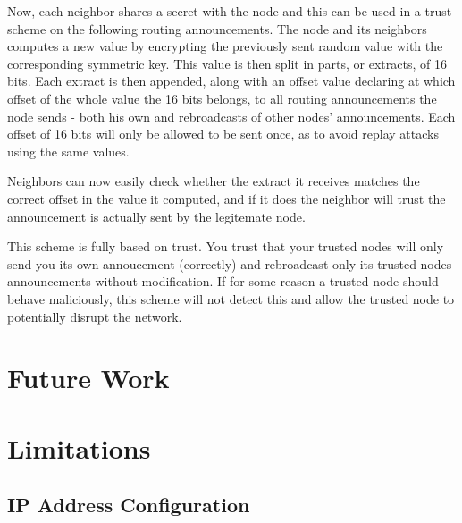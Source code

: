 Now, each neighbor shares a secret with the node and this can be used in a trust
scheme on the following routing announcements. The node and its neighbors
computes a new value by encrypting the previously sent random value with the
corresponding symmetric key. This value is then split in parts, or extracts, of
16 bits. Each extract is then appended, along with an offset value declaring at
which offset of the whole value the 16 bits belongs, to all routing
announcements the node sends - both his own and rebroadcasts of other nodes'
announcements. Each offset of 16 bits will only be allowed to be sent once, as
to avoid replay attacks using the same values. 

Neighbors can now easily check whether the extract it receives matches the
correct offset in the value it computed, and if it does the neighbor will trust
the announcement is actually sent by the legitemate node. 

This scheme is fully based on trust. You trust that your trusted nodes will only
send you its own annoucement (correctly) and rebroadcast only its trusted nodes
announcements without modification. If for some reason a trusted node should
behave maliciously, this scheme will not detect this and allow the trusted node
to potentially disrupt the network.

\section{Future Work}

\section{Limitations}

\subsection{IP Address Configuration}\label{ip_address_conf}